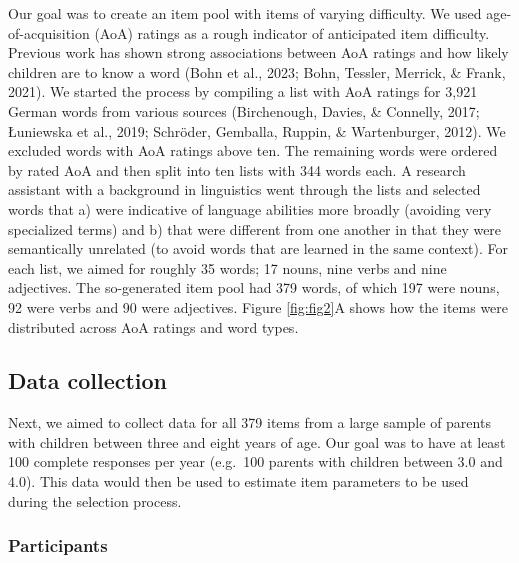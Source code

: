\documentclass[
  man,floatsintext]{apa6}
\begin{document}
Our goal was to create an item pool with items of varying difficulty. We used age-of-acquisition (AoA) ratings as a rough indicator of anticipated item difficulty. Previous work has shown strong associations between AoA ratings and how likely children are to know a word (Bohn et al., 2023; Bohn, Tessler, Merrick, \& Frank, 2021). We started the process by compiling a list with AoA ratings for 3,921 German words from various sources (Birchenough, Davies, \& Connelly, 2017; Łuniewska et al., 2019; Schröder, Gemballa, Ruppin, \& Wartenburger, 2012). We excluded words with AoA ratings above ten. The remaining words were ordered by rated AoA and then split into ten lists with 344 words each. A research assistant with a background in linguistics went through the lists and selected words that a) were indicative of language abilities more broadly (avoiding very specialized terms) and b) that were different from one another in that they were semantically unrelated (to avoid words that are learned in the same context). For each list, we aimed for roughly 35 words; 17 nouns, nine verbs and nine adjectives. The so-generated item pool had 379 words, of which 197 were nouns, 92 were verbs and 90 were adjectives. Figure \ref{fig:fig2}A shows how the items were distributed across AoA ratings and word types.

\hypertarget{data-collection}{%
\subsection{Data collection}\label{data-collection}}

Next, we aimed to collect data for all 379 items from a large sample of parents with children between three and eight years of age. Our goal was to have at least 100 complete responses per year (e.g.~100 parents with children between 3.0 and 4.0). This data would then be used to estimate item parameters to be used during the selection process.

\hypertarget{participants}{%
\subsubsection{Participants}\label{participants}}
\end{document}
